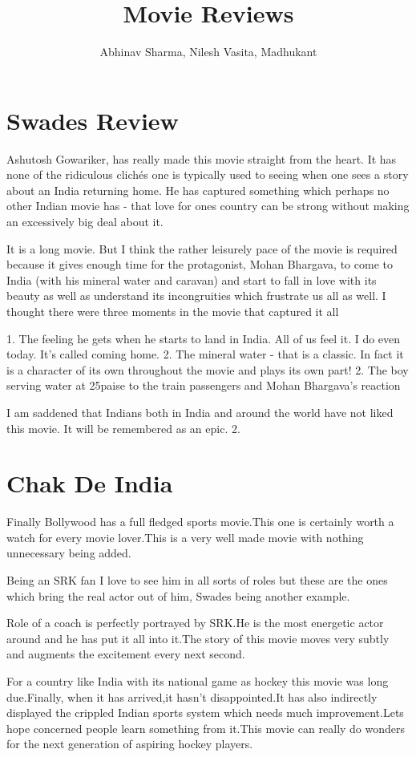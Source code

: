 \documentclass[]{article}
\title{Movie Reviews}
\author{Abhinav Sharma, Nilesh Vasita, Madhukant}
\date
\begin{document}
\maketitle
\section{Swades Review}
Ashutosh Gowariker, has really made this movie straight from the heart. It has none of the ridiculous clichés one is typically used to seeing when one sees a story about an India returning home. He has captured something which perhaps no other Indian movie has - that love for ones country can be strong without making an excessively big deal about it.

It is a long movie. But I think the rather leisurely pace of the movie is required because it gives enough time for the protagonist, Mohan Bhargava, to come to India (with his mineral water and caravan) and start to fall in love with its beauty as well as understand its incongruities which frustrate us all as well. I thought there were three moments in the movie that captured it all

1. The feeling he gets when he starts to land in India. All of us feel it. I do even today. It's called coming home. 2. The mineral water - that is a classic. In fact it is a character of its own throughout the movie and plays its own part! 2. The boy serving water at 25paise to the train passengers and Mohan Bhargava's reaction

I am saddened that Indians both in India and around the world have not liked this movie. It will be remembered as an epic. 2.

\section{Chak De India}
Finally Bollywood has a full fledged sports movie.This one is certainly worth a watch for every movie lover.This is a very well made movie with nothing unnecessary being added.


Being an SRK fan I love to see him in all sorts of roles but these are the ones which bring the real actor out of him, Swades being another example.

Role of a coach is perfectly portrayed by SRK.He is the most energetic actor around and he has put it all into it.The story of this movie moves very subtly and augments the excitement every next second.

For a country like India with its national game as hockey this movie was long due.Finally, when it has arrived,it hasn't disappointed.It has also indirectly displayed the crippled Indian sports system which needs much improvement.Lets hope concerned people learn something from it.This movie can really do wonders for the next generation of aspiring hockey players.
\end{document}
